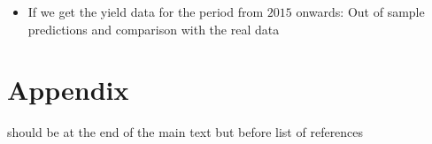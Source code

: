 \documentclass[12pt]{iopart}
\begin{document}
\begin{itemize}
\item If we get the yield data for the period from $2015$ onwards: Out of sample predictions and comparison with the real data
\end{itemize}





\color{black}

\clearpage

\appendix
\section*{Appendix}
should be at the end of the main text but before list of references




 \nocite{BOKU} 
 \nocite{Berkeley} 

\end{document}
